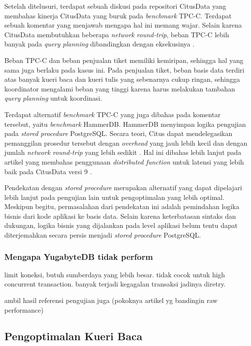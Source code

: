 Setelah ditelusuri, terdapat sebuah diskusi pada repositori CitusData yang membahas kinerja CitusData yang buruk pada \textit{benchmark} TPC-C. Terdapat sebuah komentar yang menjawab mengapa hal ini memang wajar. Selain karena CitusData membutuhkan beberapa \textit{network round-trip}, beban TPC-C lebih banyak pada \textit{query planning} dibandingkan dengan eksekusinya \parencite{Slot2020}.

Beban TPC-C dan beban penjualan tiket memiliki kemiripan, sehingga hal yang sama juga berlaku pada kasus ini. Pada penjualan tiket, beban basis data terdiri atas banyak kueri baca dan kueri tulis yang sebenarnya cukup ringan, sehingga koordinator mengalami beban yang tinggi karena harus melakukan tambahan \textit{query planning} untuk koordinasi.

Terdapat alternatif \textit{benchmark} TPC-C yang juga dibahas pada komentar tersebut, yaitu \textit{benchmark} HammerDB. HammerDB menyimpan logika pengujian pada \textit{stored procedure} PostgreSQL. Secara teori, Citus dapat mendelegasikan pemanggilan prosedur tersebut dengan \textit{overhead} yang jauh lebih kecil dan dengan jumlah \textit{network round-trip} yang lebih sedikit \parencite{Slot2020}. Hal ini dibahas lebih lanjut pada artikel yang membahas penggunaan \textit{distributed function} untuk latensi yang lebih baik pada CitusData versi 9 \parencite{Slot2020faster}.

Pendekatan dengan \textit{stored procedure} merupakan alternatif yang dapat dipelajari lebih lanjut pada pengujian lain untuk pengoptimalan yang lebih optimal. Meskipun begitu, permasalahan dari pendekatan ini adalah pemindahan logika bisnis dari kode aplikasi ke basis data. Selain karena keterbatasan sintaks dan dukungan, logika bisnis yang dijalankan pada level aplikasi belum tentu dapat diterjemahkan secara persis menjadi \textit{stored procedure} PostgreSQL.

\subsubsection{Mengapa YugabyteDB tidak perform}

limit koneksi, butuh sumberdaya yang lebih besar. tidak cocok untuk high concurrent transaction. banyak terjadi kegagalan transaksi jadinya diretry.

ambil hasil referensi pengujian juga (pokoknya artikel yg bandingin raw performance)

\subsection{Pengoptimalan Kueri Baca}

